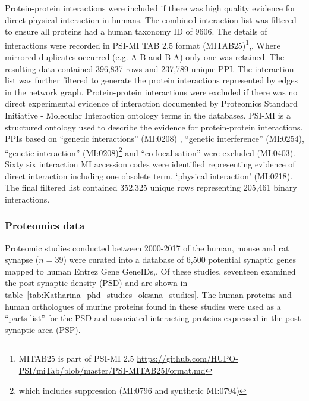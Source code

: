 Protein-protein interactions were included if there was high quality evidence for direct physical interaction in humans. The combined interaction list was filtered to ensure all proteins had a human taxonomy ID of 9606. The details of interactions were recorded in PSI-MI TAB 2.5 format (MITAB25)\footnote{MITAB25 is part of  PSI-MI 2.5 \url{https://github.com/HUPO-PSI/miTab/blob/master/PSI-MITAB25Format.md}}\cite{isserlin2011biomolecular},\cite{heil2018systems}. Where mirrored duplicates occurred (e.g. A-B and B-A) only one was retained. The  resulting data contained 396,837 rows and 237,789 unique PPI.  The interaction list was further filtered to generate the protein interactions represented by edges in the network graph. Protein-protein interactions were excluded if there was no direct experimental evidence of interaction documented by Proteomics Standard Initiative - Molecular Interaction ontology terms in the databases. PSI-MI is a structured ontology used to describe the evidence for protein-protein interactions.\cite{isserlin2011biomolecular} PPIs based on ``genetic interactions'' (MI:0208) , ``genetic interference'' (MI:0254), ``genetic interaction'' (MI:0208)\footnote{which includes suppression (MI:0796 and synthetic MI:0794)} and ``co-localisation'' were excluded (MI:0403). Sixty six interaction MI accession codes were identified representing evidence of direct interaction including one obsolete term, `physical interaction' (MI:0218). The final filtered list contained 352,325 unique rows representing 205,461 binary interactions.




\subsubsection{Proteomics data}
\label{sec:proteomics data}
Proteomic studies conducted between 2000-2017 of the human, mouse and rat synapse ($n=39$) were curated into a database of 6,500 potential synaptic genes  mapped to human Entrez Gene GeneIDs\cite{heil2018systems},\cite{maglott2005entrez}.  Of these studies, seventeen examined the post synaptic density (PSD) and are shown in table~\ref{tab:Katharina_phd_studies_oksana_studies}.
The human proteins and human orthologues of murine proteins found in these studies were used as a ``parts list'' for the PSD and associated interacting proteins expressed in the post synaptic area (PSP). 

